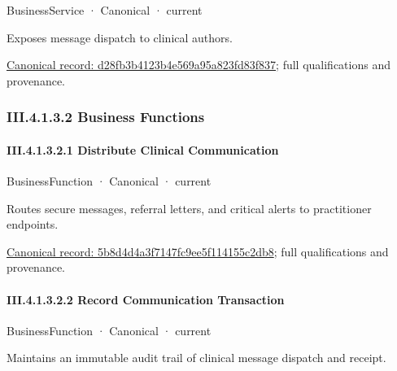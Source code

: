 \label{element:d28fb3b4123b4e569a95a823fd83f837}
{\small BusinessService · Canonical · current}\par

Exposes message dispatch to clinical authors.


{\footnotesize \href{../../../../continuum/business/business-service/d28fb3b4123b4e569a95a823fd83f837.md}{Canonical record: d28fb3b4123b4e569a95a823fd83f837}; full qualifications and provenance.}\par
\subsubsection*{III.4.1.3.2 Business Functions}
\label{navigation:III.4.1.3.2}

\paragraph*{III.4.1.3.2.1 Distribute Clinical Communication}
\label{navigation:III.4.1.3.2.1}

\label{element:5b8d4d4a3f7147fc9ee5f114155c2db8}
{\small BusinessFunction · Canonical · current}\par

Routes secure messages, referral letters, and critical alerts to practitioner endpoints.


{\footnotesize \href{../../../../continuum/business/business-function/5b8d4d4a3f7147fc9ee5f114155c2db8.md}{Canonical record: 5b8d4d4a3f7147fc9ee5f114155c2db8}; full qualifications and provenance.}\par
\paragraph*{III.4.1.3.2.2 Record Communication Transaction}
\label{navigation:III.4.1.3.2.2}

\label{element:d64ced698052400fa7892e4d768b3f8f}
{\small BusinessFunction · Canonical · current}\par

Maintains an immutable audit trail of clinical message dispatch and receipt.


